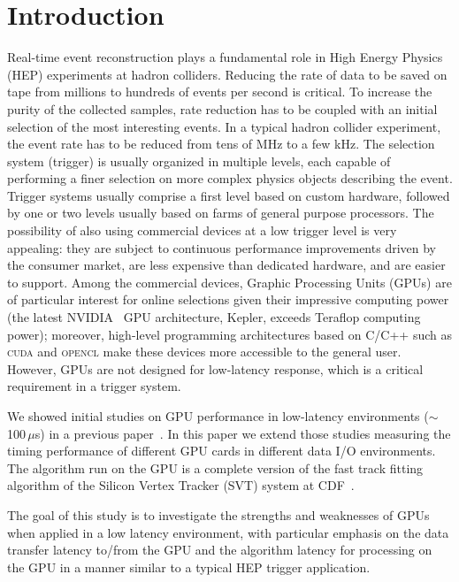 \documentclass[letterpaper]{jpconf}
\begin{document}
\section{Introduction}
Real-time event reconstruction plays a fundamental role in High Energy
Physics (HEP) experiments at hadron colliders.  Reducing the rate of
data to be saved on tape from millions to hundreds of events per
second is critical. To increase the purity of the collected samples,
rate reduction has to be coupled with an initial selection of the most
interesting events.  In a typical hadron collider experiment, the
event rate has to be reduced from tens of MHz to a few kHz.  The
selection system (trigger) is usually organized in multiple levels,
each capable of performing a finer selection on more complex physics
objects describing the event. Trigger systems usually comprise a first
level based on custom hardware, followed by one or two levels usually
based on farms of general purpose processors.  The possibility of also
using commercial devices at a low trigger level is very appealing:
they are subject to continuous performance improvements driven by the
consumer market, are less expensive than dedicated hardware, and are
easier to support.  Among the commercial devices, Graphic Processing
Units (GPUs) are of particular interest for online selections given
their impressive computing power (the latest NVIDIA~\cite{bib_nvidia}
GPU architecture, Kepler, exceeds Teraflop computing power); moreover,
high-level programming architectures based on C/C++ such as
\textsc{cuda} and \textsc{opencl} make these devices more accessible
to the general user.  However, GPUs are not designed for low-latency
response, which is a critical requirement in a trigger system.

We showed initial studies on GPU performance in low-latency
environments ($\sim$100\,$\mu$s) in a previous paper~\cite{TIPP2011,
  NSS2012}.  In this paper we extend those studies measuring the
timing performance of different GPU cards in different data I/O
environments. The algorithm run on the GPU is a complete version of
the fast track fitting algorithm of the Silicon Vertex Tracker (SVT)
system at CDF~\cite{SVT1}.

The goal of this study is to investigate the strengths and weaknesses
of GPUs when applied in a low latency environment, with particular
emphasis on the data transfer latency to/from the GPU and the
algorithm latency for processing on the GPU in a manner similar to a
typical HEP trigger application.
\end{document}
